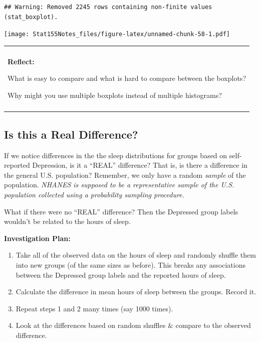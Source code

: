 \documentclass[]{book}
\newenvironment{Shaded}{\begin{snugshade}}{\end{snugshade}}
\newcommand{\DataTypeTok}[1]{\textcolor[rgb]{0.13,0.29,0.53}{#1}}
\newcommand{\KeywordTok}[1]{\textcolor[rgb]{0.13,0.29,0.53}{\textbf{#1}}}
\newcommand{\NormalTok}[1]{#1}
\newcommand{\OperatorTok}[1]{\textcolor[rgb]{0.81,0.36,0.00}{\textbf{#1}}}
\newcommand{\StringTok}[1]{\textcolor[rgb]{0.31,0.60,0.02}{#1}}
\providecommand{\tightlist}{%
  \setlength{\itemsep}{0pt}\setlength{\parskip}{0pt}}
\newenvironment{reflect}
{
    \begin{center}
    
    \begin{tabular}{|p{0.8\textwidth}|}
    \rowcolor{LightBlue}
    \hline\\
    \rowcolor{LightBlue}
    \textbf{Reflect:}
}
{
    \\\rowcolor{LightBlue}
    \\\hline
    \end{tabular} 
    \end{center}
}
\begin{document}
\begin{Shaded}
\end{Shaded}

\begin{verbatim}
## Warning: Removed 2245 rows containing non-finite values (stat_boxplot).
\end{verbatim}

\texttt{[image: Stat155Notes\_files/figure-latex/unnamed-chunk-58-1.pdf]}

\begin{reflect}
What is easy to compare and what is hard to compare between the
boxplots?

Why might you use multiple boxplots instead of multiple histograms?
\end{reflect}

\hypertarget{is-this-a-real-difference}{%
\subsection{Is this a Real Difference?}\label{is-this-a-real-difference}}

If we notice differences in the the sleep distributions for groups based on self-reported Depression, is it a ``REAL'' difference? That is, is there a difference in the general U.S. population? Remember, we only have a random \emph{sample} of the population. \emph{NHANES is supposed to be a representative sample of the U.S. population collected using a probability sampling procedure.}

What if there were no ``REAL'' difference? Then the Depressed group labels wouldn't be related to the hours of sleep.

\textbf{Investigation Plan:}

\begin{enumerate}
\def\labelenumi{\arabic{enumi}.}
\tightlist
\item
  Take all of the observed data on the hours of sleep and randomly shuffle them into new groups (of the same sizes as before). This breaks any associations between the Depressed group labels and the reported hours of sleep.
\item
  Calculate the difference in mean hours of sleep between the groups. Record it.
\item
  Repeat steps 1 and 2 many times (say 1000 times).
\item
  Look at the differences based on random shuffles \& compare to the observed difference.
\end{enumerate}
\end{document}
